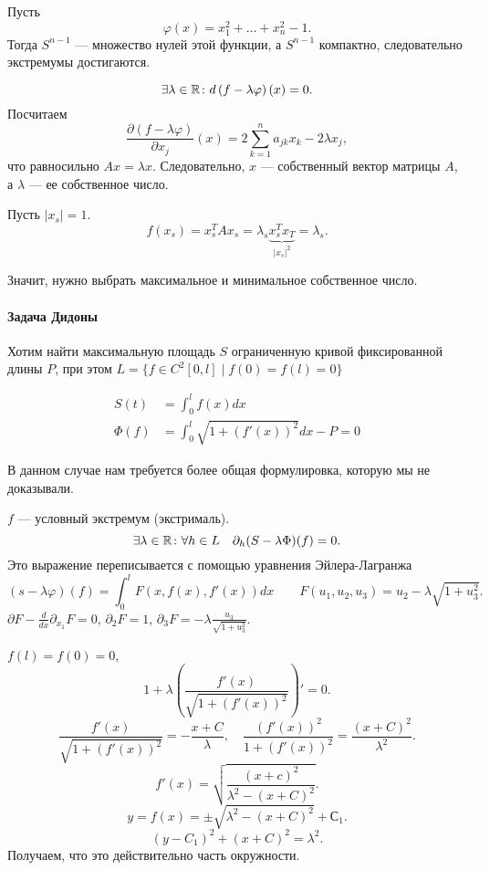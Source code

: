 Пусть
\[
    \varphi (x) = x_1^2 + \ldots + x_{n}^2 - 1
.\] 
Тогда $ S^{n-1}$ --- множество нулей этой функции, а $ S^{n-1}$ компактно, следовательно экстремумы достигаются. 

\[
    \exists \lambda \in  \mathbb{R}\colon d\left( f- \lambda \varphi  \right) (x) = 0
.\] 
Посчитаем
\[
    \frac{\partial (f-\lambda \varphi )}{\partial  x_j} (x) =  2 \sum_{k=1}^{n} a_{jk} x_k - 2 \lambda x_j
,\] 
что равносильно $ Ax = \lambda x$.
Следовательно, $ x $ --- собственный вектор матрицы $ A$, а  $ \lambda$ --- ее собственное число.

Пусть $ \lvert x_s  \rvert = 1$.
\[
    f(x_s) = x_s^{T}A x_s = \lambda_s \underbrace{x_s^{T}x_T}_{\lvert x_s \rvert ^2} = \lambda _s
.\] 

Значит, нужно выбрать максимальное и минимальное собственное число.
\paragraph{Задача Дидоны}
Хотим найти максимальную площадь $ S$ ограниченную кривой фиксированной длины $ P$, при этом $ L = \{f \in C^{2}[0, l] \mid f(0) = f(l) = 0\}$

\begin{align*}
    S(t) &= \int_{0}^{l} f(x) dx  \\
    \Phi(f) &= \int_{0}^{l} \sqrt{1+ (f'(x))^2 } dx - P = 0
\end{align*}

В данном случае нам требуется более общая формулировка, которую мы не доказывали.

$ f$ ---  условный экстремум (экстрималь). 
\[
    \exists \lambda \in  \mathbb{R}\colon \forall h \in L \quad \partial _h(S - \lambda \Phi)(f) = 0
.\] 
Это выражение переписывается с помощью уравнения Эйлера-Лагранжа
\[
    (s-\lambda \varphi )(f) = \int_{0}^{l} F(x, f(x), f'(x)) dx  \qquad F(u_1, u_2, u_3) = u_2 - \lambda \sqrt{ 1+u_3^2} 
.\] 
$ \partial F - \frac{d}{dx}\partial _{x_1} F = 0$, $ \partial _2 F = 1$, $ \partial _3 F = - \lambda \frac{u_3}{\sqrt{ 1 + u_3^2} }$.

$ f(l) = f(0) = 0$,  \[
    1 + \lambda \left( \frac{f'(x)}{\sqrt{ 1 + (f'(x))^2} } \right) ' = 0 
.\] 
\[
    \frac{f'(x)}{\sqrt{ 1 + (f'(x))^2} } = - \frac{x +C}{\lambda}, \quad \frac{(f'(x))^2}{1+(f'(x))^2} = \frac{(x+ C)^2}{\lambda ^2}
.\] 
\[
    f'(x) = \sqrt{ \frac{(x+c)^2}{\lambda^2 - (x+C)^2}}  
.\] 
\[
    y = f(x) = \pm \sqrt{\lambda ^2 - (x + C)^2 } + С_1 
.\] 
\[
    (y- C_1)^2 + (x+C)^2 = \lambda^2
.\] 
Получаем, что это действительно часть окружности.
